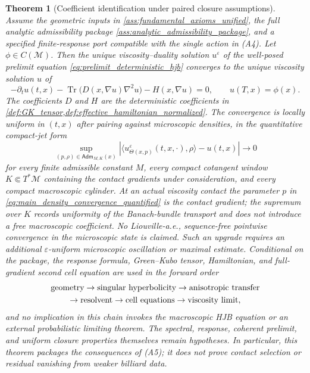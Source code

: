 \documentclass[12pt, letterpaper]{amsart}
\newcommand{\Mcal}{\mathcal{M}}
\providecommand{\Tr}{\operatorname{Tr}}
\newcommand{\Adm}{\mathsf{Adm}}
\theoremstyle{plain}
\newtheorem{theorem}{Theorem}[section]
\theoremstyle{definition}
\theoremstyle{remark}
\begin{document}
\begin{theorem}[Coefficient identification under paired closure assumptions]
\label{thm:main_homogenization}
Assume the geometric inputs in \cref{ass:fundamental_axioms_unified}, the full
analytic admissibility package \cref{ass:analytic_admissibility_package}, and a
specified finite-response port compatible with the single action in
\textup{(A4)}.  Let $\phi\in C(\Mcal)$.  Then the unique
viscosity--duality solution $u^\varepsilon$ of the well-posed prelimit equation
\eqref{eq:prelimit_deterministic_hjb} converges to the unique
viscosity solution $u$ of
\begin{equation}
\label{eq:effective_hjb_final}
    -\partial_tu(t,x)-\Tr\big(D(x,\nabla u)\nabla^2u\big)-H(x,\nabla u)=0,
    \qquad u(T,x)=\phi(x).
\end{equation}
The coefficients $D$ and $H$ are the deterministic coefficients in
\cref{def:GK_tensor,def:effective_hamiltonian_normalized}.  The convergence is
locally uniform in $(t,x)$ after pairing against microscopic densities, in the
quantitative compact-jet form
\begin{equation}
\label{eq:main_density_convergence_quantified}
    \sup_{(p,\rho)\in\Adm_{M,K}(x)}
    \left|\langle u^\varepsilon_{\Theta(x,p)}(t,x,\cdot),\rho\rangle-u(t,x)\right|
    \longrightarrow0
\end{equation}
for every finite admissible constant $M$, every compact cotangent window
$K\Subset T^*\Mcal$ containing the contact gradients under consideration, and
every compact macroscopic cylinder.  At an actual viscosity contact the
parameter $p$ in \eqref{eq:main_density_convergence_quantified} is the contact
gradient; the supremum over $K$ records uniformity of the Banach-bundle
transport and does not introduce a free macroscopic coefficient.  No
Liouville-a.e., sequence-free pointwise convergence in the microscopic state is
claimed.  Such an upgrade requires an additional $\varepsilon$-uniform
microscopic oscillation or maximal estimate.  Conditional on the package, the
response formula, Green--Kubo tensor, Hamiltonian, and full-gradient second
cell equation are used in the forward order
\begin{equation}
\begin{gathered}
    \hbox{geometry}\to\hbox{singular hyperbolicity}
    \to\hbox{anisotropic transfer}\\
    \to\hbox{resolvent}\to
    \hbox{cell equations}\to\hbox{viscosity limit},
\end{gathered}
\end{equation}
and no implication in this chain invokes the macroscopic HJB equation or an
    external probabilistic limiting theorem. The spectral, response, coherent
prelimit, and uniform closure properties themselves remain hypotheses. In
particular, this theorem packages the consequences of \textup{(A5)}; it does
not prove contact selection or residual vanishing from weaker billiard data.
\end{theorem}
\end{document}
